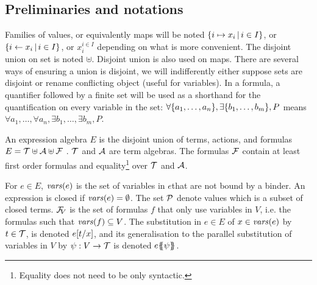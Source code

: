 \documentclass[runningheads]{llncs}
\begin{document}
\subsection{Preliminaries and notations}
Families of values, or equivalently maps will be noted \(\mset{i \mapsto x_i}{i \in I}\), or \(\mset{i \gets x_i}{i \in I}\), or \(x_i^{i \in I}\) depending on what is more convenient. %
The disjoint union on set is noted \(\uplus\).
Disjoint union is also used on maps.
There are several ways of ensuring a union is disjoint, we will indifferently either suppose sets are disjoint or rename conflicting object (useful for variables).
In a formula, a quantifier followed by a finite set will be used as a shorthand for the quantification on every variable in the set:
\(\forall \mbrc{a_1, \dots, a_n}, \exists \mbrc{b_1, \dots, b_m}, P\) means \(\forall a_1, \dots, \forall a_n, \exists b_1, \dots, \exists b_m, P\).

An expression algebra \(E\) is the disjoint union  of  terms,  actions, and  formulas
\( E=\terms \uplus \actions \uplus \formulas\) .
\(\terms\) and \(\actions\) are term algebras.
The formulas \(\formulas\) contain at least first order formulas and equality\footnote{Equality does not need to be only syntactic.} over \(\terms\) and \(\actions\). 

For \(e \in E\),
 \(\fvars{e}\) is the set of variables in  $e$that are not bound by a binder. An expression is closed if \(\fvars{e}=\emptyset\).
The set \(\values\) denote values which is a subset of closed terms. \(\rformulas[V]\) is the set of formulas $f$ that only use variables in $V$, i.e. the formulas such that  \(\fvars{f}\subseteq V\).
The substitution in \(e \in E\) of \(x \in \fvars{e}\) by \(t \in \terms\), is denoted \(e\subst{t}{x}\), and its generalisation to the parallel substitution of variables in \(V\) by \(\psi: V \to \terms\) is denoted \(e\psubst{\psi}\).
\end{document}
